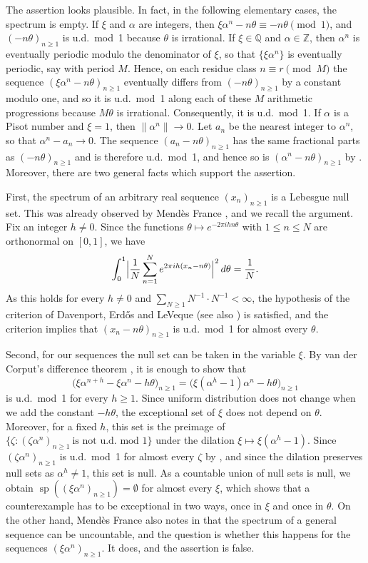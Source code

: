 \documentclass[11pt,reqno]{amsart}
\theoremstyle{definition}
\theoremstyle{remark}
\numberwithin{equation}{section}
\DeclareMathOperator{\spec}{sp}
\newcommand{\Z}{\mathbb{Z}}
\newcommand{\Q}{\mathbb{Q}}
\begin{document}
The assertion looks plausible. In fact, in the following elementary cases, the spectrum is empty. If $\xi$ and $\alpha$ are integers, then $\xi\alpha^n-n\theta\equiv-n\theta\pmod1$, and $(-n\theta)_{n\ge1}$ is u.d.\ mod~1 because $\theta$ is irrational. If $\xi\in\Q$ and $\alpha\in\Z$, then $\alpha^n$ is eventually periodic modulo the denominator of $\xi$, so that $\{\xi\alpha^n\}$ is eventually periodic, say with period $M$. Hence, on each residue class $n\equiv r\pmod M$ the sequence $(\xi\alpha^n-n\theta)_{n\ge1}$ eventually differs from $(-n\theta)_{n\ge1}$ by a constant modulo one, and so it is u.d.\ mod~1 along each of these $M$ arithmetic progressions because $M\theta$ is irrational. Consequently, it is u.d.\ mod~1. If $\alpha$ is a Pisot number and $\xi=1$, then $\|\alpha^n\|\to0$. Let $a_n$ be the nearest integer to $\alpha^n$, so that $\alpha^n-a_n\to0$. The sequence $(a_n-n\theta)_{n\ge1}$ has the same fractional parts as $(-n\theta)_{n\ge1}$ and is therefore u.d.\ mod~1, and hence so is $(\alpha^n-n\theta)_{n\ge1}$ by \cite[Chapter~1, Theorem~1.2]{KN}. Moreover, there are two general facts which support the assertion.

First, the spectrum of an arbitrary real sequence $(x_n)_{n\ge1}$ is a Lebesgue null set. This was already observed by Mend\`es France \cite{MFa}, and we recall the argument. Fix an integer $h\ne0$. Since the functions $\theta\mapsto e^{-2\pi ihn\theta}$ with $1\le n\le N$ are orthonormal on $[0,1]$, we have
\[
\int_0^1\Bigl|\frac1N\sum_{n=1}^Ne^{2\pi ih(x_n-n\theta)}\Bigr|^2\,d\theta=\frac1N .
\]
As this holds for every $h\ne0$ and $\sum_{N\ge1}N^{-1}\cdot N^{-1}<\infty$, the hypothesis of the criterion of Davenport, Erd\H os and LeVeque \cite{DEL} (see also \cite{KN}) is satisfied, and the criterion implies that $(x_n-n\theta)_{n\ge1}$ is u.d.\ mod~1 for almost every $\theta$.

Second, for our sequences the null set can be taken in the variable $\xi$. By van der Corput's difference theorem \cite{KN}, it is enough to show that
\[
\bigl(\xi\alpha^{n+h}-\xi\alpha^n-h\theta\bigr)_{n\ge1}=\bigl(\xi(\alpha^h-1)\alpha^n-h\theta\bigr)_{n\ge1}
\]
is u.d.\ mod~1 for every $h\ge1$. Since uniform distribution does not change when we add the constant $-h\theta$, the exceptional set of $\xi$ does not depend on $\theta$. Moreover, for a fixed $h$, this set is the preimage of $\{\zeta:(\zeta\alpha^n)_{n\ge1}\ \text{is not u.d.\ mod }1\}$ under the dilation $\xi\mapsto\xi(\alpha^h-1)$. Since $(\zeta\alpha^n)_{n\ge1}$ is u.d.\ mod~1 for almost every $\zeta$ by \cite[Corollary~1.9]{Bu}, and since the dilation preserves null sets as $\alpha^h\ne1$, this set is null. As a countable union of null sets is null, we obtain $\spec((\xi\alpha^n)_{n\ge1})=\emptyset$ for almost every $\xi$, which shows that a counterexample has to be exceptional in two ways, once in $\xi$ and once in $\theta$. On the other hand, Mend\`es France also notes in \cite[Probl\`eme~5]{MF} that the spectrum of a general sequence can be uncountable, and the question is whether this happens for the sequences $(\xi\alpha^n)_{n\ge1}$. It does, and the assertion is false.
\end{document}

